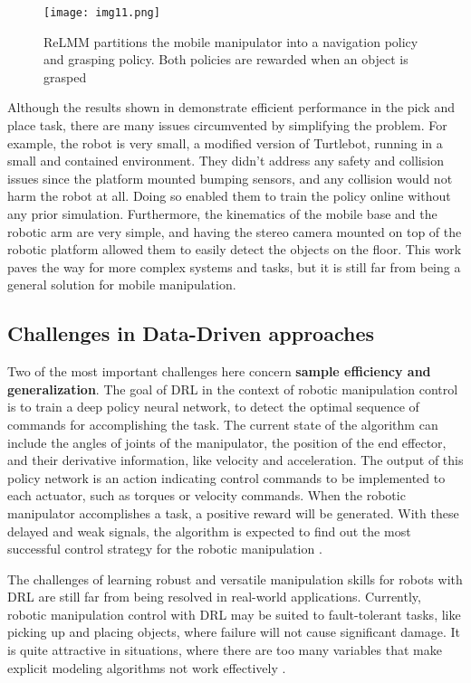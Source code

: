 \begin{figure}[t]
	\centering
	\texttt{[image: img11.png]}
	\captionsetup{width=1\linewidth}
	\caption{ReLMM partitions the mobile manipulator into a navigation policy
		and grasping policy. Both policies are rewarded when an object is grasped
		\cite{sun2022relmm}}
	\label{fig:img11}
\end{figure}

Although the results shown in \cite{sun2022relmm} demonstrate efficient performance in
the pick and place task, there are many issues circumvented by simplifying the problem.
For example, the robot is very small, a modified version of Turtlebot, running in a small and
contained environment. They didn't address any safety and collision issues since the platform
mounted bumping sensors, and any collision would not harm the robot at all. Doing so enabled them
to train the policy online without any prior simulation.
Furthermore, the kinematics of the mobile base and the robotic arm are very simple, and having the
stereo camera mounted on top of the robotic platform allowed them to easily detect the objects
on the floor. This work paves the way for more complex systems and tasks, but it is still far
from being a general solution for mobile manipulation.

\subsection{Challenges in Data-Driven approaches}

Two of the most important challenges here concern \textbf{sample efficiency and generalization}.
The goal of DRL in the context of robotic manipulation
control is to train a deep policy neural network, to detect the optimal
sequence of commands for accomplishing the task. The current state of the algorithm can include
the angles of joints of the manipulator, the position of the end effector, and their derivative information,
like velocity and acceleration. The output of this policy network is an action indicating control
commands to be implemented to each actuator, such as torques or velocity commands. When the robotic manipulator
accomplishes a task, a positive reward will be generated. With these delayed and weak
signals, the algorithm is expected to find out the most successful control strategy for the
robotic manipulation \cite{liu2021deep}.

The challenges of learning robust and versatile manipulation skills
for robots with DRL are still far from being resolved in real-world applications.
Currently, robotic manipulation control with DRL may be suited to fault-tolerant
tasks, like picking up and placing objects, where failure will not cause significant damage.
It is quite attractive in situations, where there are too many
variables that make explicit modeling algorithms not work effectively \cite{liu2021deep}.

